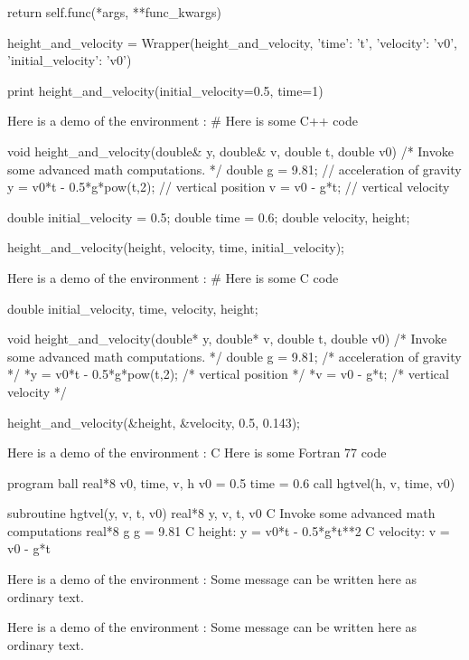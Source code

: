         return self.func(*args, **func_kwargs)

height_and_velocity = Wrapper(height_and_velocity,
      {'time': 't', 'velocity': 'v0', 'initial_velocity': 'v0'})

print height_and_velocity(initial_velocity=0.5, time=1)

\noindent
Here is a demo of the environment :
# Here is some C++ code

void height_and_velocity(double& y, double& v,
                         double t, double v0)
{
    /*
    Invoke some advanced math computations.
    */
    double g = 9.81;               // acceleration of gravity
    y = v0*t - 0.5*g*pow(t,2);     // vertical position
    v = v0 - g*t;                  // vertical velocity
}

double initial_velocity = 0.5;
double time = 0.6;
double velocity, height;

height_and_velocity(height, velocity, time, initial_velocity);

\noindent
Here is a demo of the environment :
# Here is some C code

double initial_velocity, time, velocity, height;

void height_and_velocity(double* y, double* v,
                         double t, double v0)
{
    /*
    Invoke some advanced math computations.
    */
    double g = 9.81;                /* acceleration of gravity */
    *y = v0*t - 0.5*g*pow(t,2);     /* vertical position */
    *v = v0 - g*t;                  /* vertical velocity */
}

height_and_velocity(&height, &velocity, 0.5, 0.143);

\noindent
Here is a demo of the environment :
C Here is some Fortran 77 code

       program ball
       real*8 v0, time, v, h
       v0 = 0.5
       time = 0.6
       call hgtvel(h, v, time, v0)

       subroutine hgtvel(y, v, t, v0)
       real*8 y, v, t, v0
C      Invoke some advanced math computations
       real*8 g
       g = 9.81
C      height:
       y = v0*t - 0.5*g*t**2
C      velocity:
       v = v0 - g*t

\noindent
Here is a demo of the environment :
Some message can be written here as ordinary
text.


\noindent
Here is a demo of the environment :
Some message can be written here as ordinary
text.


